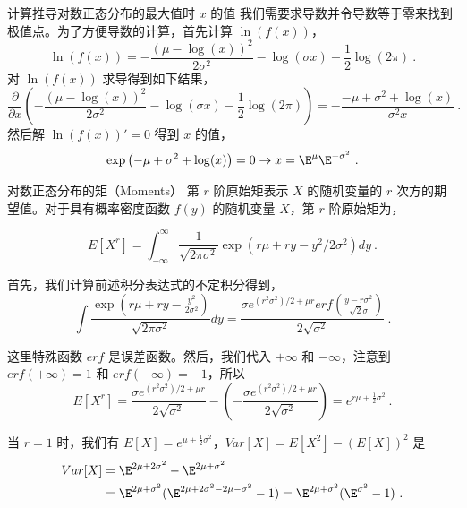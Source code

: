 \begin{example}{计算推导对数正态分布的最大值时 \( x \) 的值}
我们需要求导数并令导数等于零来找到极值点。为了方便导数的计算，首先计算 $\ln(f(x))$，
\begin{equation}
    \ln(f(x)) = -\frac{(\mu-\log (x))^2}{2 \sigma^2}-\log (\sigma x)-\frac{1}{2} \log (2 \pi)~.
\end{equation}
对 $\ln(f(x))$ 求导得到如下结果，
\begin{equation}
\frac{\partial}{\partial x}\left(-\frac{(\mu-\log (x))^2}{2 \sigma^2}-\log (\sigma x)-\frac{1}{2} \log (2 \pi)\right) = -\frac{-\mu+\sigma^2+\log (x)}{\sigma^2 x}~.
\end{equation}
然后解 $\ln(f(x))'=0$ 得到 $x$ 的值，
\begin{equation}
    \exp \left({-\mu+\sigma^2+\log (x)}\right) = 0 \rightarrow x = \E^{\mu}\E^{-\sigma^2}~.
\end{equation}
\end{example}
\begin{example}{对数正态分布的矩（Moments）}
第 $r$ 阶原始矩表示 $X$ 的随机变量的 $r$ 次方的期望值。对于具有概率密度函数 $f(y)$ 的随机变量 $X$，第 $r$ 阶原始矩为，

\begin{equation}
E\left[X^r\right]=\int_{-\infty}^{\infty} \frac{1}{\sqrt{2 \pi \sigma^2}} \exp \left(r \mu+r y-y^2 / 2 \sigma^2\right)dy ~.
\end{equation}

首先，我们计算前述积分表达式的不定积分得到，
\begin{equation}
\int \frac{\exp \left(r \mu+r y-\frac{y^2}{2 \sigma^2}\right)}{\sqrt{2 \pi \sigma^2}} d y=\frac{\sigma e^{\left(r^2 \sigma^2\right) / 2+\mu r} erf\left(\frac{y-r \sigma^2}{\sqrt{2} \sigma}\right)}{2 \sqrt{\sigma^2}}~.
\end{equation}

这里特殊函数 $erf$ 是误差函数。然后，我们代入 $+\infty$ 和 $-\infty$，注意到 $erf(+\infty)=1$ 和 $erf(-\infty)=-1$，所以
\begin{equation}
E\left[X^r\right]=\frac{\sigma e^{\left(r^2 \sigma^2\right) / 2+\mu r}}{2 \sqrt{\sigma^2}}-\left(-\frac{\sigma e^{\left(r^2 \sigma^2\right) / 2+\mu r}}{2 \sqrt{\sigma^2}}\right) = e^{r\mu+\frac{1}{2}\sigma^2}~.
\end{equation}

当 $r=1$ 时，我们有 $E\left[X\right]=e^{\mu+\frac{1}{2}\sigma^2}$，$Var[X] = E\left[X^2\right] - \left(E\left[X\right]\right)^2$ 是
\begin{align}
Var[X] &= \E^{2\mu+2\sigma^2} - \E^{2\mu+\sigma^2} \\
&= \E^{2\mu+\sigma^2}(\E^{2\mu+2\sigma^2-2\mu-\sigma^2}- 1) = \E^{2\mu+\sigma^2}(\E^{\sigma^2}- 1)~.
\end{align}

\end{example}